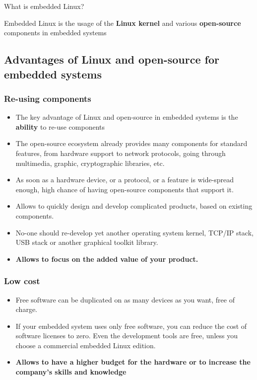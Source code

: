 \begin{frame}{What is embedded Linux?}
  \huge
  \begin{center}
    Embedded Linux is the usage of the {\bf Linux kernel} and various
    {\bf open-source} components in embedded systems
  \end{center}
\end{frame}

\subsection[Why embedded Linux?]{Advantages of Linux and open-source
  for embedded systems}

\begin{frame}
  \frametitle{Re-using components}
  \begin{itemize}
  \item The key advantage of Linux and open-source in embedded systems
    is the {\bf ability} to re-use components
  \item The open-source ecosystem already provides many components for
    standard features, from hardware support to network protocols,
    going through multimedia, graphic, cryptographic libraries, etc.
  \item As soon as a hardware device, or a protocol, or a feature is
    wide-spread enough, high chance of having open-source components
    that support it.
  \item Allows to quickly design and develop complicated products,
    based on existing components.
  \item No-one should re-develop yet another operating system kernel,
    TCP/IP stack, USB stack or another graphical toolkit library.
  \item {\bf Allows to focus on the added value of your product.}
  \end{itemize}
\end{frame}

\begin{frame}
  \frametitle{Low cost}
  \begin{itemize}
  \item Free software can be duplicated on as many devices as you
    want, free of charge.
  \item If your embedded system uses only free software, you can
    reduce the cost of software licenses to zero. Even the development
    tools are free, unless you choose a commercial embedded Linux
    edition.
  \item {\bf Allows to have a higher budget for the hardware or to
      increase the company’s skills and knowledge}
  \end{itemize}
\end{frame}


